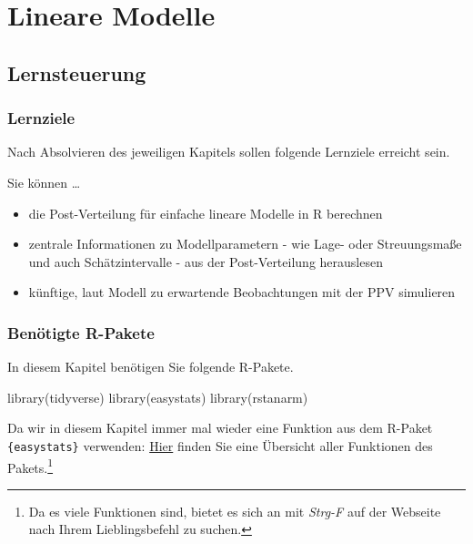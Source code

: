 \documentclass[
  a4paper,
  DIV=11]{scrreprt}
\newenvironment{Shaded}{\begin{snugshade}}{\end{snugshade}}
\newcommand{\FunctionTok}[1]{\textcolor[rgb]{0.28,0.35,0.67}{#1}}
\newcommand{\NormalTok}[1]{\textcolor[rgb]{0.00,0.23,0.31}{#1}}
\providecommand{\tightlist}{%
  \setlength{\itemsep}{0pt}\setlength{\parskip}{0pt}}\usepackage{longtable,booktabs,array}
\theoremstyle{definition}
\theoremstyle{remark}
\begin{document}

\hypertarget{lineare-modelle}{%
\chapter{Lineare Modelle}\label{lineare-modelle}}

\hypertarget{lernsteuerung-7}{%
\section{Lernsteuerung}\label{lernsteuerung-7}}

\hypertarget{lernziele-8}{%
\subsection{Lernziele}\label{lernziele-8}}

Nach Absolvieren des jeweiligen Kapitels sollen folgende Lernziele
erreicht sein.

Sie können \ldots{}

\begin{itemize}
\tightlist
\item
  die Post-Verteilung für einfache lineare Modelle in R berechnen
\item
  zentrale Informationen zu Modellparametern - wie Lage- oder
  Streuungsmaße und auch Schätzintervalle - aus der Post-Verteilung
  herauslesen
\item
  künftige, laut Modell zu erwartende Beobachtungen mit der PPV
  simulieren
\end{itemize}

\hypertarget{benuxf6tigte-r-pakete-5}{%
\subsection{Benötigte R-Pakete}\label{benuxf6tigte-r-pakete-5}}

In diesem Kapitel benötigen Sie folgende R-Pakete.

\begin{Shaded}
\begin{Highlighting}[]
\FunctionTok{library}\NormalTok{(tidyverse)}
\FunctionTok{library}\NormalTok{(easystats)}
\FunctionTok{library}\NormalTok{(rstanarm)}
\end{Highlighting}
\end{Shaded}

Da wir in diesem Kapitel immer mal wieder eine Funktion aus dem R-Paket
\texttt{\{easystats\}} verwenden:
\href{https://easystats.github.io/easystats/articles/list_of_functions.html}{Hier}
finden Sie eine Übersicht aller Funktionen des Pakets.\footnote{Da es
  viele Funktionen sind, bietet es sich an mit \emph{Strg-F} auf der
  Webseite nach Ihrem Lieblingsbefehl zu suchen.}
\end{document}
